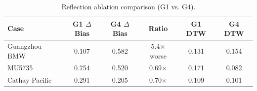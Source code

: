 \begin{table}[t]
\centering
\caption{Reflection ablation comparison (G1 vs. G4).}
\label{tab:reflection_ablation}
\begin{tabular}{lccccc}
\toprule
Case & G1 $\Delta$Bias & G4 $\Delta$Bias & Ratio & G1 DTW & G4 DTW \\
\midrule
Guangzhou BMW & 0.107 & 0.582 & 5.4$\times$ worse & 0.131 & 0.154 \\
MU5735 & 0.754 & 0.520 & 0.69$\times$ & 0.171 & 0.082 \\
Cathay Pacific & 0.291 & 0.205 & 0.70$\times$ & 0.109 & 0.101 \\
\bottomrule
\end{tabular}
\end{table}
